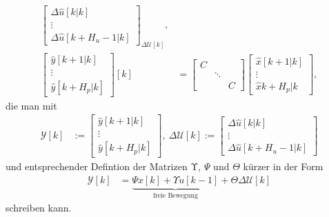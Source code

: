 \begin{align*}
{\begin{bmatrix}
\Delta\hat{u}[k|k]\\
\vdots\\
\Delta\hat{u}[k+H_u-1|k]
\end{bmatrix}}_{\Delta\mathcal{U}[k]},\\
\begin{bmatrix}
\hat{y}[k+1|k]\\ \vdots\\ \hat{y}[k+H_p|k]
\end{bmatrix}[k]& = \begin{bmatrix}
C	&			&	\\
	& \ddots	&	\\
	&			& C
\end{bmatrix}\begin{bmatrix}
\hat{x}[k+1|k]\\ \vdots\\ \hat{x}{k+H_p|k}
\end{bmatrix},
\end{align*}
die man mit 
\begin{align*}
	\mathcal{Y}[k] & := \begin{bmatrix}
	\hat{y}[k+1|k]\\
	\vdots\\
	\hat{y}[k+H_p|k]
	\end{bmatrix},\ \Delta\mathcal{U}[k]:=\begin{bmatrix}
	\Delta \hat{u}[k|k]\\
	\vdots\\
	\Delta\hat{u}[k+H_u-1|k]
	\end{bmatrix}
\end{align*}
und entsprechender Defintion der Matrizen $\mathrm{\Upsilon}$, $\Psi$ und $\Theta$ kürzer in der Form %
\begin{align}
\mathcal{Y}[k] & = \underbrace{\Psi x[k]+\Upsilon u[k-1]}_{\text{freie Bewegung}}+\Theta\Delta\mathcal{U}[k] \label{eqn:kap_4_zustandsraummodell_steuerdiff}
\end{align}
schreiben kann.


